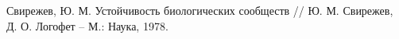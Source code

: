 \begin{thebibliography}{9}
        Свирежев, Ю. М. Устойчивость биологических сообществ // Ю. М. Свирежев, Д. О. Логофет -- М.: Наука, 1978.

\end{thebibliography}